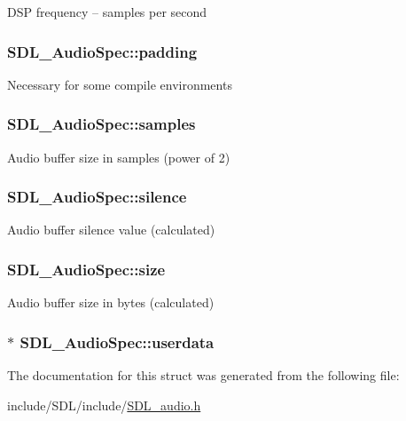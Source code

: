 D\-S\-P frequency -- samples per second \hypertarget{struct_s_d_l___audio_spec_a738371fc13b54cefef4db16994abeeb6}{
\subsubsection[{padding}]{ S\-D\-L\-\_\-\-Audio\-Spec\-::padding}}\label{struct_s_d_l___audio_spec_a738371fc13b54cefef4db16994abeeb6}
Necessary for some compile environments \hypertarget{struct_s_d_l___audio_spec_a2cdf5e885808c10bfa2810b706e69f95}{
\subsubsection[{samples}]{ S\-D\-L\-\_\-\-Audio\-Spec\-::samples}}\label{struct_s_d_l___audio_spec_a2cdf5e885808c10bfa2810b706e69f95}
Audio buffer size in samples (power of 2) \hypertarget{struct_s_d_l___audio_spec_addc462c8a806e6c122eccf63482048f6}{
\subsubsection[{silence}]{ S\-D\-L\-\_\-\-Audio\-Spec\-::silence}}\label{struct_s_d_l___audio_spec_addc462c8a806e6c122eccf63482048f6}
Audio buffer silence value (calculated) \hypertarget{struct_s_d_l___audio_spec_a154cf44743ecec78c36dc6c827dd2fdb}{
\subsubsection[{size}]{ S\-D\-L\-\_\-\-Audio\-Spec\-::size}}\label{struct_s_d_l___audio_spec_a154cf44743ecec78c36dc6c827dd2fdb}
Audio buffer size in bytes (calculated) \hypertarget{struct_s_d_l___audio_spec_aeec9481666f5f0982c98d3878f175d9b}{
\subsubsection[{userdata}]{$\ast$ S\-D\-L\-\_\-\-Audio\-Spec\-::userdata}}\label{struct_s_d_l___audio_spec_aeec9481666f5f0982c98d3878f175d9b}


The documentation for this struct was generated from the following file\-:\begin{DoxyCompactItemize}
\item 
include/\-S\-D\-L/include/\hyperlink{_s_d_l__audio_8h}{S\-D\-L\-\_\-audio.\-h}\end{DoxyCompactItemize}
